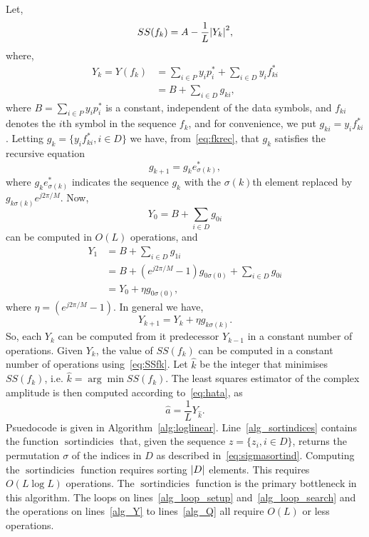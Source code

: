 \documentclass[journal]{IEEEtran}
\begin{document}
Let,
\begin{equation}\label{eq:SSfk}
SS(f_k) = A - \frac{1}{L}{\left| Y_k \right|}^2,
\end{equation}
where, 
\begin{align*}
Y_k = Y( f_k ) &= \sum_{i \in P} y_i p_i^*  + \sum_{i \in D} y_i f_{ki}^* \\
&= B + \sum_{i \in D}g_{ki},
\end{align*}
where $B = \sum_{i \in P} y_i p_i^*$ is a constant, independent of the data symbols, and $f_{ki}$ denotes the $i$th symbol in the sequence $f_k$, and for convenience, we put $g_{ki}  = y_i f_{ki}^*$.  Letting $g_{k} =\{ y_i f_{ki}^*, i \in D\}$ we have, from~\eqref{eq:fkrec}, that $g_k$ satisfies the recursive equation
\[
g_{k+1} = g_{k} e_{\sigma(k)}^*,
\]
where $g_{k} e_{\sigma(k)}^*$ indicates the sequence $g_k$ with the $\sigma(k)$th element replaced by $g_{k \sigma(k)}e^{j2\pi/M}$.  Now,
\[
Y_0 = B + \sum_{i \in D} g_{0i}
\] 
can be computed in $O(L)$ operations, and
\begin{align*}
Y_1 &= B + \sum_{i \in D} g_{1i} \\
&= B +  (e^{j2\pi/M} - 1)g_{0\sigma(0)} + \sum_{i \in D} g_{0i} \\
&= Y_0 + \eta g_{0\sigma(0)},
\end{align*}
where $\eta = (e^{j2\pi/M} - 1)$.  In general we have,
\[
Y_{k+1} = Y_k + \eta g_{k\sigma(k)}.
\]
So, each $Y_k$ can be computed from it predecessor $Y_{k-1}$ in a constant number of operations.  Given $Y_k$, the value of $SS(f_k)$ can be computed in a constant number of operations using~\eqref{eq:SSfk}.  Let $\hat{k}$ be the integer that minimises $SS(f_k)$, i.e. $\hat{k} = \arg\min SS(f_k)$.  The least squares estimator of the complex amplitude is then computed according to~\eqref{eq:hata}, as 
\begin{equation}\label{eq:ahatYhat}
\hat{a} = \frac{1}{L} Y_{\hat{k}}.
\end{equation}
Psuedocode is given in Algorithm~\ref{alg:loglinear}.  Line~\ref{alg_sortindices} contains the function $\operatorname{sortindicies}$ that, given the sequence $z = \{z_i, i \in D\}$, returns the permutation $\sigma$ of the indices in $D$ as described in~\eqref{eq:sigmasortind}.  Computing the $\operatorname{sortindicies}$ function requires sorting ${\left| D \right|}$ elements.  This requires $O(L \log L)$ operations.  The $\operatorname{sortindicies}$ function is the primary bottleneck in this algorithm.  The loops on lines~\ref{alg_loop_setup} and~\ref{alg_loop_search} and the operations on lines~\ref{alg_Y} to lines~\ref{alg_Q} all require $O(L)$ or less operations.  %
\end{document}
